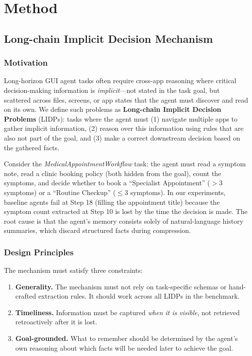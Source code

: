 \section{Method}


\subsection{Long-chain Implicit Decision Mechanism}
\label{subsec:lidm}

\subsubsection{Motivation}

Long-horizon GUI agent tasks often require cross-app reasoning where critical
decision-making information is \textit{implicit}---not stated in the task goal,
but scattered across files, screens, or app states that the agent must
discover and read on its own. We define such problems as
\textbf{Long-chain Implicit Decision Problems} (LIDPs): tasks where the agent
must (1) navigate multiple apps to gather implicit information, (2) reason over
this information using rules that are also not part of the goal, and (3) make a
correct downstream decision based on the gathered facts.

Consider the \textit{MedicalAppointmentWorkflow} task: the agent must read a
symptom note, read a clinic booking policy (both hidden from the goal), count
the symptoms, and decide whether to book a ``Specialist Appointment''
($>3$ symptoms) or a ``Routine Checkup'' ($\leq 3$ symptoms). In our
experiments, baseline agents fail at Step 18 (filling the appointment title)
because the symptom count extracted at Step 10 is lost by the time the
decision is made. The root cause is that the agent's memory consists solely
of natural-language history summaries, which discard structured facts during
compression.

\subsubsection{Design Principles}

The mechanism must satisfy three constraints:
\begin{enumerate}[leftmargin=*]
    \item \textbf{Generality.} The mechanism must not rely on task-specific
    schemas or hand-crafted extraction rules. It should work across all LIDPs
    in the benchmark.
    \item \textbf{Timeliness.} Information must be captured \textit{when it is
    visible}, not retrieved retroactively after it is lost.
    \item \textbf{Goal-grounded.} What to remember should be determined by the
    agent's own reasoning about which facts will be needed later to achieve
    the goal.
\end{enumerate}

